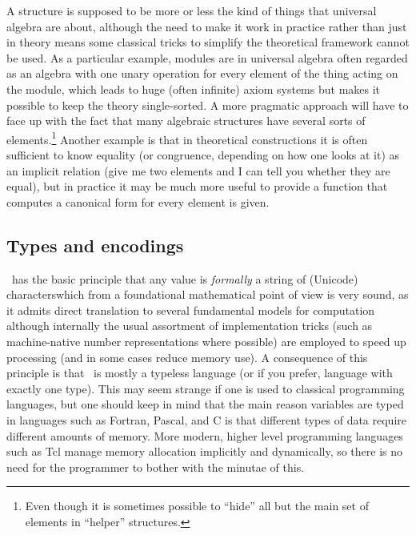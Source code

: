 \documentclass{mtmtcl}
\theoremstyle{plain}
\theoremstyle{remark}
\begin{document}
A structure is supposed to be more or less the kind of things that 
universal algebra are about, although the need to make it work in 
practice rather than just in theory means some classical tricks to 
simplify the theoretical framework cannot be used. As a particular 
example, modules are in universal algebra often regarded as an 
algebra with one unary operation for every element of the thing 
acting on the module, which leads to huge (often infinite) axiom 
systems but makes it possible to keep the theory single-sorted. A 
more pragmatic approach will have to face up with the fact that many 
algebraic structures have several sorts of elements.\footnote{\relax
  Even though it is sometimes possible to ``hide'' all but the main 
  set of elements in ``helper'' structures.
} Another example is that in theoretical constructions it is often 
sufficient to know equality (or congruence, depending on how one 
looks at it) as an implicit relation (give me two elements and I can 
tell you whether they are equal), but in practice it may be much 
more useful to provide a function that computes a canonical form 
for every element is given.


\subsection{Types and encodings}

\Tcl\ has the basic principle that any value is 
\emph{formally} a string of (Unicode) characters\Ldash which from a 
foundational mathematical point of view is very sound, as it admits 
direct translation to several fundamental models for computation\Dash 
although internally the usual assortment of implementation tricks 
(such as machine-native number representations where possible) are 
employed to speed up processing (and in some cases reduce memory use). 
A consequence of this principle is that \Tcl\ is mostly a typeless 
language (or if you prefer, language with exactly one type). This may 
seem strange if one is used to classical programming languages, but 
one should keep in mind that the main reason variables are typed in 
languages such as Fortran, Pascal, and C is that different types of 
data require different amounts of memory. More modern, higher level 
programming languages such as Tcl manage memory allocation implicitly 
and dynamically, so there is no need for the programmer to bother 
with the minutae of this.
\end{document}

